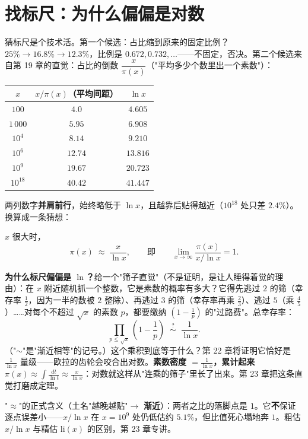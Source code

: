 \section{找标尺：为什么偏偏是对数}

猜标尺是个技术活。第一个候选：占比缩到原来的固定比例？$25\% \to 16.8\% \to 12.3\%$，比例是 $0.672, 0.732, \dots$——不固定，否决。第二个候选来自第 19 章的直觉：占比的倒数 $\dfrac{x}{\pi(x)}$（"平均多少个数里出一个素数"）：

\begin{center}
\begin{tabular}{ccc}
\toprule
$x$ & $x/\pi(x)$（平均间距） & $\ln x$ \\
\midrule
$100$ & $4.0$ & $4.605$ \\
$1\,000$ & $5.95$ & $6.908$ \\
$10^4$ & $8.14$ & $9.210$ \\
$10^6$ & $12.74$ & $13.816$ \\
$10^9$ & $19.67$ & $20.723$ \\
$10^{18}$ & $40.42$ & $41.447$ \\
\bottomrule
\end{tabular}
\end{center}

两列数字\textbf{并肩前行}，始终略低于 $\ln x$，且越靠后贴得越近（$10^{18}$ 处只差 $2.4\%$）。换算成一条猜想：

\begin{caixiang}[素数定理]
$x$ 很大时，
\[
\pi(x) \;\approx\; \frac{x}{\ln x},
\qquad \text{即} \qquad
\lim_{x\to\infty} \frac{\pi(x)}{x/\ln x} = 1 .
\]
\end{caixiang}

\textbf{为什么标尺偏偏是 $\ln$？}给一个"筛子直觉"（不是证明，是让人睡得着觉的理由）：在 $x$ 附近随机抓一个整数，它是素数的概率有多大？它得先逃过 $2$ 的筛（幸存率 $\tfrac12$，因为一半的数被 $2$ 整除）、再逃过 $3$ 的筛（幸存率再乘 $\tfrac23$）、逃过 $5$（乘 $\tfrac45$）……对每个不超过 $\sqrt x$ 的素数 $p$，都要缴纳 $\left(1 - \tfrac1p\right)$ 的"过路费"。总幸存率：
\[
\prod_{p \le \sqrt x}\left(1 - \frac1p\right)
\;\;\overset{?}{\sim}\;\; \frac{1}{\ln x} .
\]
（"$\sim$"是"渐近相等"的记号。）这个乘积到底等于什么？第 22 章将证明它恰好是 $\tfrac{1}{\ln x}$ 量级——欧拉的齿轮会咬合出对数。\textbf{素数密度 $= \tfrac1{\ln x}$，累计起来 $\pi(x) \approx \int \tfrac{dt}{\ln t} \approx \tfrac{x}{\ln x}$}：对数就这样从"连乘的筛子"里长了出来。第 23 章把这条直觉打磨成定理。

\begin{cidian}
"$\approx$"的正式含义（土名"越晚越贴"$\to$ \textbf{渐近}）：两者之比的落脚点是 $1$。它\textbf{不}保证逐点误差小——$x/\ln x$ 在 $x = 10^9$ 处仍低估约 $5.1\%$，但比值死心塌地奔 $1$。粗估 $x/\ln x$ 与精估 $\mathrm{li}(x)$ 的区别，第 23 章专讲。
\end{cidian}

